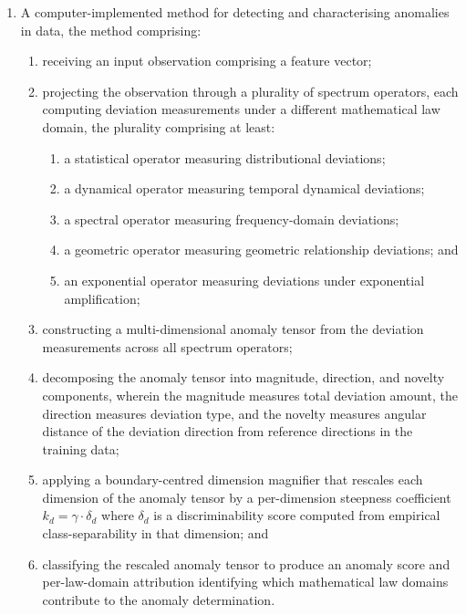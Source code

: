 \documentclass[12pt,a4paper]{article}
\begin{document}
\begin{enumerate}[label=\textbf{\arabic*.}]

\item A computer-implemented method for detecting and characterising anomalies
in data, the method comprising:
\begin{enumerate}[label=(\alph*)]
\item receiving an input observation comprising a feature vector;

\item projecting the observation through a plurality of spectrum operators,
each computing deviation measurements under a different mathematical law
domain, the plurality comprising at least:
\begin{enumerate}[label=(\roman*)]
\item a statistical operator measuring distributional deviations;
\item a dynamical operator measuring temporal dynamical deviations;
\item a spectral operator measuring frequency-domain deviations;
\item a geometric operator measuring geometric relationship deviations; and
\item an exponential operator measuring deviations under exponential
amplification;
\end{enumerate}

\item constructing a multi-dimensional anomaly tensor from the deviation
measurements across all spectrum operators;

\item decomposing the anomaly tensor into magnitude, direction, and novelty
components, wherein the magnitude measures total deviation amount, the
direction measures deviation type, and the novelty measures angular distance
of the deviation direction from reference directions in the training data;

\item applying a boundary-centred dimension magnifier that rescales each
dimension of the anomaly tensor by a per-dimension steepness coefficient
$k_d = \gamma \cdot \delta_d$ where $\delta_d$ is a discriminability score
computed from empirical class-separability in that dimension; and

\item classifying the rescaled anomaly tensor to produce an anomaly score
and per-law-domain attribution identifying which mathematical law domains
contribute to the anomaly determination.
\end{enumerate}


\end{enumerate}
\end{document}
